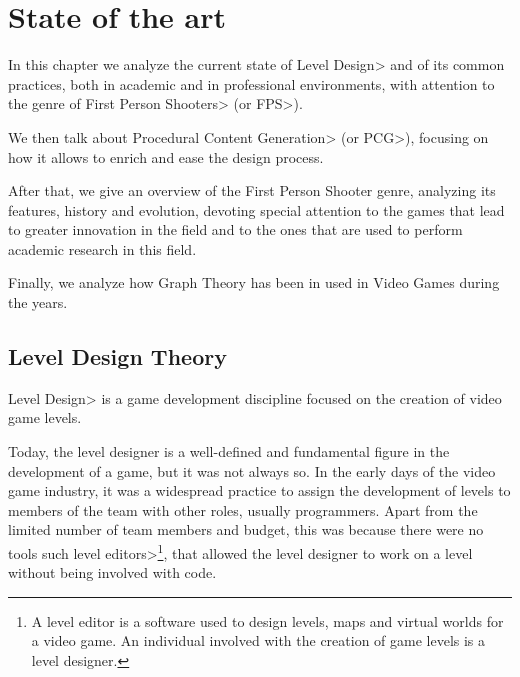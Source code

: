 \chapter{State of the art}


In this chapter we analyze the current state of \<Level Design> and of its common practices, both in academic and in professional environments, with attention to the genre of \<First Person Shooters> (or \<FPS>).

\par

We then talk about \<Procedural Content Generation> (or \<PCG>), focusing on how it allows to enrich and ease the design process.

\par

After that, we give an overview of the First Person Shooter genre, analyzing its features, history and evolution, devoting special attention to the games that lead to greater innovation in the field and to the ones that are used to perform academic research in this field.

\par

Finally, we analyze how Graph Theory has been in used in Video Games during the years.


\section{Level Design Theory}

\<Level Design> is a game development discipline focused on the creation of video game levels.

\par

Today, the level designer is a well-defined and fundamental figure in the development of a game, but it was not always so. In the early days of the video game industry, it was a widespread practice to assign the development of levels to members of the team with other roles, usually programmers. Apart from the limited number of team members and budget, this was because there were no tools such \<level editors>\footnote{\label{levelEditorFootnote}A level editor is a software used to design levels, maps and virtual worlds for a video game. An individual involved with the creation of game levels is a level designer.}, that allowed the level designer to work on a level without being involved with code.

